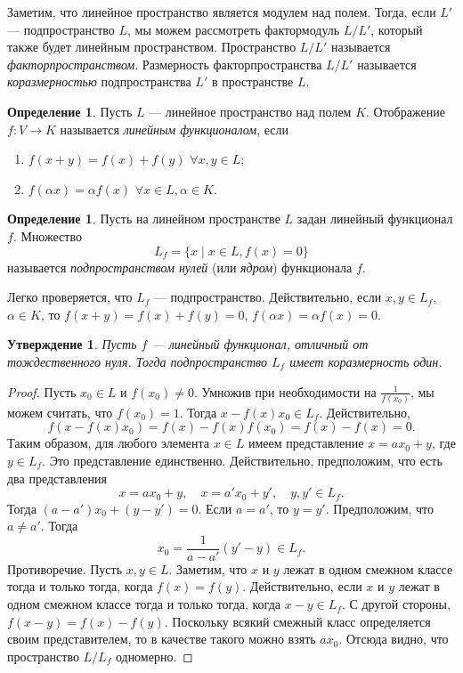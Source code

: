 \documentclass[12pt, titlepage, oneside]{amsbook}
\newtheorem{claim}[theorem]{Утверждение}
\theoremstyle{definition}
\newtheorem{definition}[theorem]{Определение}
\theoremstyle{remark}
\begin{document}
Заметим, что линейное пространство является модулем над полем. Тогда, если $L'$ --- подпространство $L$, мы можем рассмотреть фактормодуль $L/L'$, который также будет линейным пространством. Пространство $L/L'$ называется \emph{факторпространством}. Размерность факторпространства $L/L'$ называется \emph{коразмерностью} подпространства $L'$ в пространстве $L$.

\begin{definition}
Пусть $L$ --- линейное пространство над полем $K$. Отображение $f\colon V\rightarrow K$ называется \emph{линейным функционалом}, если
\begin{enumerate}
\item $f(x+y)=f(x)+f(y)$ $\forall x,y\in L$;
\item $f(\alpha x)=\alpha f(x)$ $\forall x\in L,\alpha\in K$.
\end{enumerate}
\end{definition}

\begin{definition}
Пусть на линейном пространстве $L$ задан линейный функционал $f$. Множество $$L_f=\{x\mid x\in L, f(x)=0\}$$ называется \emph{подпространством нулей} (или \emph{ядром}) функционала $f$.
\end{definition}

Легко проверяется, что $L_f$ --- подпространство. Действительно, если $x,y\in L_f$, $\alpha\in K$, то $f(x+y)=f(x)+f(y)=0$, $f(\alpha x)=\alpha f(x)=0$.

 \begin{claim}
\label{LP1}
Пусть $f$ --- линейный функционал, отличный от тождественного нуля. Тогда подпространство $L_f$ имеет коразмерность один.
\end{claim}

\begin{proof}
Пусть $x_0\in L$ и $f(x_0)\neq 0$. Умножив при необходимости на $\frac{1}{f(x_0)}$, мы можем считать, что $f(x_0)=1$. Тогда $x-f(x) x_0\in L_f$. Действительно, $$f(x-f(x) x_0)=f(x)-f(x)f(x_0)=f(x)-f(x)=0.$$ Таким образом, для любого элемента $x\in L$ имеем представление $x=ax_0+y$, где $y\in L_f$. Это представление единственно. Действительно, предположим, что есть два представления $$x=a x_0+y,\quad x=a' x_0+y',\quad y,y'\in L_f.$$ Тогда $(a-a')x_0+(y-y')=0$. Если $a=a'$, то $y=y'$. Предположим, что $a\neq a'$. Тогда $$x_0=\frac{1}{a-a'}(y'-y)\in L_f.$$ Противоречие. Пусть $x,y\in L$.  Заметим, что $x$ и $y$ лежат в одном смежном классе тогда и только тогда, когда $f(x)=f(y)$. Действительно, если $x$ и $y$ лежат в одном смежном классе тогда и только тогда, когда $x-y\in L_f$. С другой стороны, $f(x-y)=f(x)-f(y)$. Поскольку всякий смежный класс определяется своим представителем, то в качестве такого можно взять $a x_0$. Отсюда видно, что пространство $L/L_f$ одномерно.
\end{proof}
\end{document}
